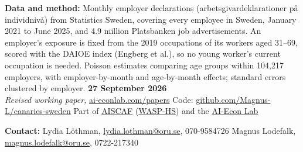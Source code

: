 \documentclass[10pt,a4paper]{article}
\begin{document}
\noindent
{\scriptsize\color{medgray}
\textbf{Data and method:} Monthly employer declarations (arbetsgivardeklarationer p\aa{}
individniv\aa{}) from Statistics Sweden, covering every employee in Sweden, January 2021 to
June 2025, and 4.9 million Platsbanken job advertisements. An employer's exposure is fixed
from the 2019 occupations of its workers aged 31--69, scored with the DAIOE index
(Engberg et al.), so no young worker's current occupation is needed. Poisson estimates
comparing age groups within 104{,}217 employers, with employer-by-month and age-by-month
effects; standard errors clustered by employer.
\hfill \textbf{27 September 2026}\\[1pt]
\textit{Revised working paper,} \href{https://www.ai-econlab.com/papers}{ai-econlab.com/papers}
\;\textbullet\; Code: \href{https://github.com/Magnus-L/canaries-sweden}{github.com/Magnus-L/canaries-sweden}
\;\textbullet\; Part of \href{https://www.aiscaf.se}{AISCAF} (\href{https://wasp-hs.org}{WASP-HS})
and the \href{https://www.ai-econlab.com}{AI-Econ Lab}}

\vspace{0.03cm}
\noindent
{\scriptsize\color{medgray}
\textbf{Contact:}
Lydia L\"othman, \href{mailto:lydia.lothman@oru.se}{lydia.lothman@oru.se}, 070-9584726
\;\textbullet\;
Magnus Lodefalk, \href{mailto:magnus.lodefalk@oru.se}{magnus.lodefalk@oru.se}, 0722-217340}
\end{document}
